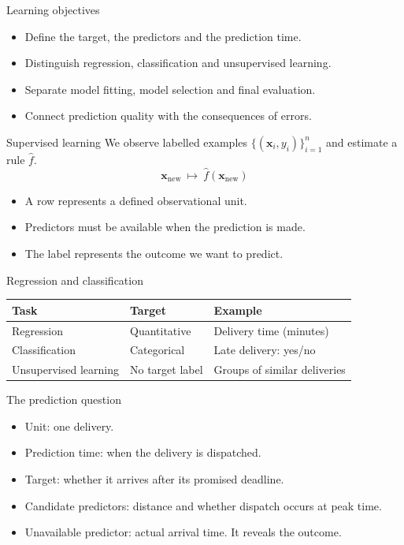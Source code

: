 \begin{frame}{Learning objectives}
\begin{itemize}
\item Define the target, the predictors and the prediction time.
\item Distinguish regression, classification and unsupervised learning.
\item Separate model fitting, model selection and final evaluation.
\item Connect prediction quality with the consequences of errors.
\end{itemize}
\end{frame}

\begin{frame}{Supervised learning}
We observe labelled examples $\{(\mathbf{x}_i,y_i)\}_{i=1}^n$ and estimate a rule $\hat f$.\[\mathbf{x}_{\mathrm{new}}\ \longmapsto\ \hat f(\mathbf{x}_{\mathrm{new}})\]\begin{itemize}
\item A row represents a defined observational unit.
\item Predictors must be available when the prediction is made.
\item The label represents the outcome we want to predict.
\end{itemize}
\end{frame}

\begin{frame}{Regression and classification}
\begin{center}\begin{tabular}{lll}\toprule
Task & Target & Example\\\midrule Regression & Quantitative & Delivery time (minutes)\\ Classification & Categorical & Late delivery: yes/no\\ Unsupervised learning & No target label & Groups of similar deliveries\\
\bottomrule\end{tabular}\end{center}
\end{frame}

\begin{frame}{The prediction question}
\begin{itemize}
\item Unit: one delivery.
\item Prediction time: when the delivery is dispatched.
\item Target: whether it arrives after its promised deadline.
\item Candidate predictors: distance and whether dispatch occurs at peak time.
\item Unavailable predictor: actual arrival time. It reveals the outcome.
\end{itemize}
\end{frame}

